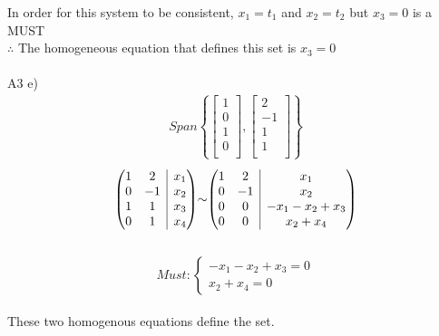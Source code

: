 \documentclass[12pt]{article}
\makeatletter
\newenvironment{amatrix}[1]{%
  \left(\begin{array}{@{}*{#1}{c}|c@{}}
}{%
  \end{array}\right)
}
\makeatother
\begin{document}
In order for this system to be consistent, $x_1 = t_1$ and $x_2 = t_2$ but $x_3 = 0$ is a MUST\\
$\therefore$ The homogeneous equation that defines this set is $x_3 = 0$\\
\\A3 e)\\
\begin{equation}
\begin{split}
Span
\left\{\begin{bmatrix}
1 \\
0 \\
1 \\
0 \\
\end{bmatrix},
\begin{bmatrix}
2 \\
-1 \\
1 \\
1 \\
\end{bmatrix}\right\}
\end{split}
\end{equation}
\begin{equation}
\begin{split}
\begin{amatrix}{2}
1 & 2 & x_1 \\ 0 & -1 & x_2 \\ 1 & 1 & x_3 \\ 0 & 1 & x_4
\end{amatrix}
\mathtt{\sim}
\begin{amatrix}{2}
1 & 2 & x_1 \\ 0 & -1 & x_2 \\ 0 & 0 & -x_1 - x_2 + x_3 \\ 0 & 0 & x_2 + x_4
\end{amatrix}
\end{split}
\end{equation}\\
\begin{equation}
Must \colon
\begin{cases}
-x_1 -x_2 + x_3 = 0\\
x_2 + x_4 = 0
\end{cases}
\end{equation}\\
These two homogenous equations define the set.

 
 
\end{document}
